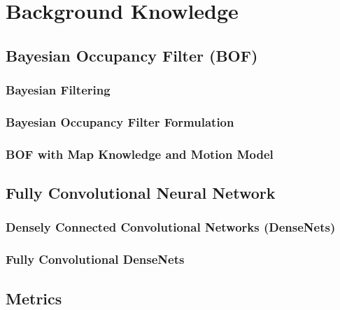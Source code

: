 \chapter{Background Knowledge} \label{chapter:3}
%
\section{Bayesian Occupancy Filter (BOF)} 

\subsection{Bayesian Filtering}

\subsection{Bayesian Occupancy Filter Formulation}

\subsection{BOF with Map Knowledge and Motion Model}

\section{Fully Convolutional Neural Network}

\subsection{Densely Connected Convolutional Networks (DenseNets)}

\subsection{Fully Convolutional DenseNets}

\section{Metrics}